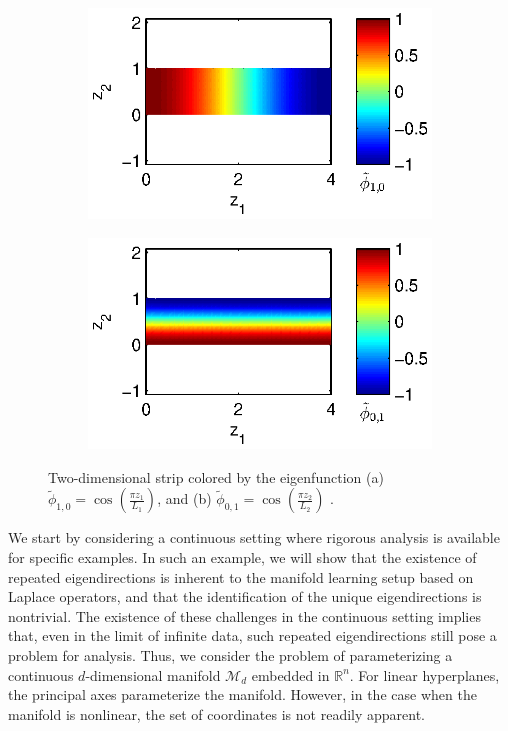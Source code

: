 \documentclass[preprint]{elsarticle}
\begin{document}
\begin{figure}[t]
\centering
\begin{subfigure}{0.45\textwidth}
\includegraphics[width=\textwidth]{strip_cnts1}
\caption{}
\end{subfigure}
%
\begin{subfigure}{0.45\textwidth}
\includegraphics[width=\textwidth]{strip_cnts2}
\caption{}
\end{subfigure}
\caption{Two-dimensional strip colored by the eigenfunction (a) $\tilde{\phi}_{1, 0} = \cos \left( \frac{\pi z_1}{L_1} \right)$, and (b) $\tilde{\phi}_{0, 1} = \cos \left( \frac{\pi z_2}{L_2} \right)$ .}
\label{fig:strip_efuncs}
\end{figure}


We start by considering a continuous setting where rigorous analysis is available for specific examples. 
%
In such an example, we will show that the existence of repeated eigendirections is inherent to the manifold learning setup based on Laplace operators, and that the identification of the unique eigendirections is nontrivial. 
%
The existence of these challenges in the continuous setting implies that, even in the limit of infinite data, such repeated eigendirections still pose a problem for analysis. 
%
Thus, we consider the problem of parameterizing a continuous $d$-dimensional manifold $\mathcal{M}_d$ embedded in $\mathbb{R}^n$.
%
For linear hyperplanes, the principal axes parameterize the manifold.
%
However, in the case when the manifold is nonlinear, the set of coordinates is not readily apparent. 
\end{document}
